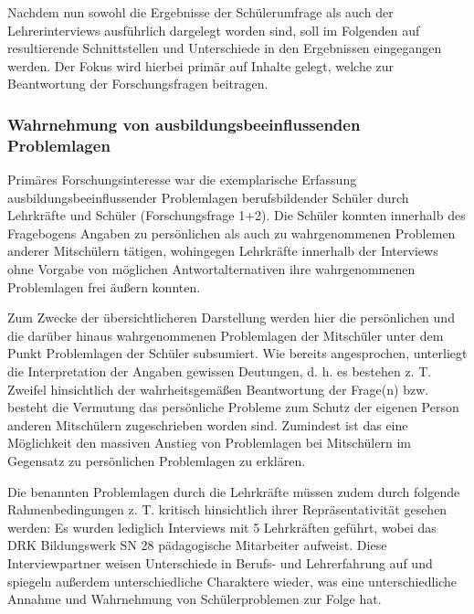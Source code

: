 Nachdem nun sowohl die Ergebnisse der Schülerumfrage als auch der Lehrerinterviews ausführlich dargelegt worden sind, soll im Folgenden auf resultierende Schnittstellen und Unterschiede in den Ergebnissen eingegangen werden. Der Fokus wird hierbei primär auf Inhalte gelegt, welche zur Beantwortung der Forschungsfragen beitragen.\\

\subsubsection{Wahrnehmung von ausbildungsbeeinflussenden Problemlagen}
\label{sec:WahrnehmungVonAusbildungsbeeinflussendenProblemlagen}

Primäres Forschungsinteresse war die exemplarische Erfassung ausbildungsbeeinflussender Problemlagen berufsbildender Schüler durch Lehrkräfte und Schüler (Forschungsfrage 1+2). Die Schüler konnten innerhalb des Fragebogens Angaben zu persönlichen als auch zu wahrgenommenen Problemen anderer Mitschülern tätigen, wohingegen Lehrkräfte innerhalb der Interviews ohne Vorgabe von möglichen Antwortalternativen ihre wahrgenommenen Problemlagen frei äußern konnten.

Zum Zwecke der übersichtlicheren Darstellung werden hier die persönlichen und die darüber hinaus wahrgenommenen Problemlagen der Mitschüler unter dem Punkt Problemlagen der Schüler subsumiert. Wie bereits angesprochen, unterliegt die Interpretation der Angaben gewissen Deutungen, d. h. es bestehen z. T. Zweifel hinsichtlich der wahrheitsgemäßen Beantwortung der Frage(n) bzw. besteht die Vermutung das persönliche Probleme zum Schutz der eigenen Person anderen Mitschülern zugeschrieben worden sind. Zumindest ist das eine Möglichkeit den massiven Anstieg von Problemlagen bei Mitschülern im Gegensatz zu persönlichen Problemlagen zu erklären.

Die benannten Problemlagen durch die Lehrkräfte müssen zudem durch folgende Rahmenbedingungen z. T. kritisch hinsichtlich ihrer Repräsentativität gesehen werden: Es wurden lediglich Interviews mit 5 Lehrkräften geführt, wobei das DRK Bildungswerk SN 28 pädagogische Mitarbeiter aufweist. Diese Interviewpartner weisen Unterschiede in Berufs- und Lehrerfahrung auf und spiegeln außerdem unterschiedliche Charaktere wieder, was eine unterschiedliche Annahme und Wahrnehmung von Schülerproblemen zur Folge hat.\\

